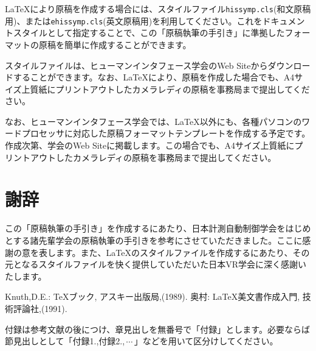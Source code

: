 \documentclass{hissymp}
\begin{document}
\LaTeX{}\cite{tex1,tex2}により原稿を作成する場合には、スタイルファイル{\tt hissymp.cls}(和文原稿用)、または{\tt ehissymp.cls}(英文原稿用)を利用してください。これをドキュメントスタイルとして指定することで、この「原稿執筆の手引き」に準拠したフォーマットの原稿を簡単に作成することができます。

スタイルファイルは、ヒューマンインタフェース学会のWeb Siteからダウンロードすることができます。なお、\LaTeX{}により、原稿を作成した場合でも、A4サイズ上質紙にプリントアウトしたカメラレディの原稿を事務局まで提出してください。

なお、ヒューマンインタフェース学会では、\LaTeX{}以外にも、各種パソコンのワードプロセッサに対応した原稿フォーマットテンプレートを作成する予定です。作成次第、学会のWeb Siteに掲載します。この場合でも、A4サイズ上質紙にプリントアウトしたカメラレディの原稿を事務局まで提出してください。



\section*{謝辞}
この「原稿執筆の手引き」を作成するにあたり、日本計測自動制御学会をはじめとする諸先輩学会の原稿執筆の手引きを参考にさせていただきました。ここに感謝の意を表します。また、\LaTeX{}のスタイルファイルを作成するにあたり、その元となるスタイルファイルを快く提供していただいた日本VR学会に深く感謝いたします。

\begin{thebibliography}{99}
	Knuth,D.E.:
	\TeX{}ブック,
	アスキー出版局,(1989).
	奥村:
	\LaTeX{}美文書作成入門,
	技術評論社,(1991).

\end{thebibliography}


\appendix{}
付録は参考文献の後につけ、章見出しを無番号で「付録」とします。必要ならば節見出しとして「付録1.,付録2.,\,$ \cdots $\,」などを用いて区分けしてください。
\end{document}
